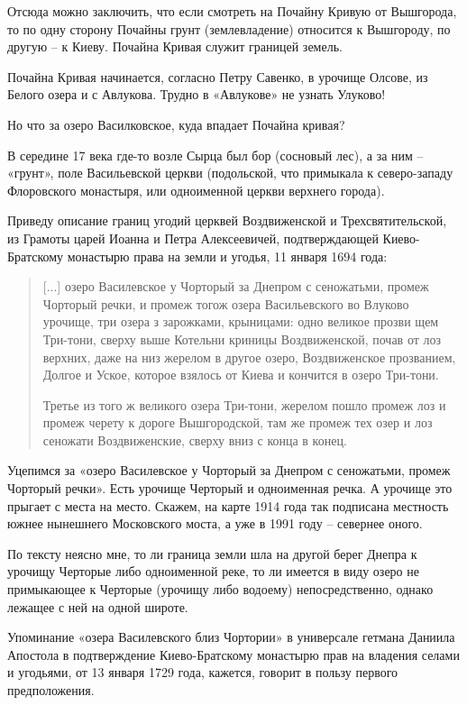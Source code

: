 Отсюда можно заключить, что если смотреть на Почайну Кривую от Вышгорода, то по одну сторону Почайны грунт (землевладение) относится к Вышгороду, по другую – к Киеву. Почайна Кривая служит границей земель.

Почайна Кривая начинается, согласно Петру Савенко, в урочище Олсове, из Белого озера и с Авлукова. Трудно в «Авлукове» не узнать Улуково! 

Но что за озеро Василковское, куда впадает Почайна кривая?

В середине 17 века где-то возле Сырца был бор (сосновый лес), а за ним – «грунт», поле Васильевской церкви (подольской, что примыкала к северо-западу Флоровского монастыря, или одноименной церкви верхнего города).

Приведу описание границ угодий церквей Воздвиженской и Трехсвятительской, из Грамоты царей Иоанна и Петра Алексеевичей, подтверждающей Киево-Братскому монастырю права на земли и угодья, 11 января 1694 года:

\begin{quotation}
[...] озеро Василевское у Чорторый за Днепром с сеножатьми, промеж Чорторый речки, и промеж тогож озера Васильевского во Влуково урочище, три озера з зарожками, крыницами: одно великое прозви щем Три-тони, сверху выше Котельни криницы Воздвиженской, почав от лоз верхних, даже на низ жерелом в другое озеро, Воздвиженское прозванием, Долгое и Уское, которое взялось от Киева и кончится в озеро Три-тони.

Третье из того ж великого озера Три-тони, жерелом пошло промеж лоз и промеж черету к дороге Вышгородской, там же промеж тех озер и лоз сеножати Воздвиженские, сверху вниз с конца в конец.
\end{quotation}

Уцепимся за «озеро Василевское у Чорторый за Днепром с сеножатьми, промеж Чорторый речки». Есть урочище Черторый и одноименная речка. А урочище это прыгает с места на место. Скажем, на карте 1914 года так подписана местность южнее нынешнего Московского моста, а уже в 1991 году – севернее оного.

По тексту неясно мне, то ли граница земли шла на другой берег Днепра к урочищу Черторые либо одноименной реке, то ли имеется в виду озеро не примыкающее к Черторые (урочищу либо водоему) непосредственно, однако лежащее с ней на одной широте.

Упоминание «озера Василевского близ Чортории» в универсале гетмана Даниила Апостола в подтверждение Киево-Братскому монастырю прав на владения селами и угодьями, от 13 января 1729 года, кажется, говорит в пользу первого предположения.

